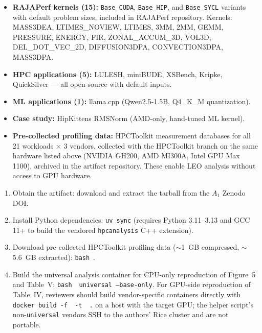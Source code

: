 \documentclass[conference]{IEEEtran}
\begin{document}
\begin{itemize}
\item \textbf{RAJAPerf kernels (15):} \texttt{Base\_CUDA}, \texttt{Base\_HIP}, and \texttt{Base\_SYCL} variants with default problem sizes, included in RAJAPerf repository. Kernels: MASS3DEA, LTIMES\_NOVIEW, LTIMES, 3MM, 2MM, GEMM, PRESSURE, ENERGY, FIR, ZONAL\_ACCUM\_3D, VOL3D, DEL\_DOT\_VEC\_2D, DIFFUSION3DPA, CONVECTION3DPA, MASS3DPA.
\item \textbf{HPC applications (5):} LULESH, miniBUDE, XSBench, Kripke, QuickSilver --- all open-source with default inputs.
\item \textbf{ML applications (1):} llama.cpp (Qwen2.5-1.5B, Q4\_K\_M quantization).
\item \textbf{Case study:} HipKittens RMSNorm (AMD-only, hand-tuned ML kernel).
\item \textbf{Pre-collected profiling data:} HPCToolkit measurement databases for all 21 workloads $\times$ 3 vendors, collected with the  HPCToolkit branch on the same hardware listed above (NVIDIA GH200, AMD MI300A, Intel GPU Max 1100), archived in the artifact repository. These enable LEO analysis without access to GPU hardware.
\end{itemize}


\begin{enumerate}
\item Obtain the artifact: download and extract the tarball from the $A_1$ Zenodo DOI.
\item Install Python dependencies: \texttt{uv sync} (requires Python 3.11--3.13 and GCC 11+ to build the vendored \texttt{hpcanalysis} C++ extension).
\item Download pre-collected HPCToolkit profiling data ($\sim$1~GB compressed, $\sim$5.6~GB extracted): \texttt{bash}~.
\item Build the universal analysis container for CPU-only reproduction of Figure~5 and Table~V: \texttt{bash}~~\texttt{universal --base-only}. For GPU-side reproduction of Table~IV, reviewers should build vendor-specific containers directly with \texttt{docker build -f}~~\texttt{-t}~~\texttt{.} on a host with the target GPU; the helper script's non-\texttt{universal} vendors SSH to the authors' Rice cluster and are not portable.
\end{enumerate}
\end{document}
